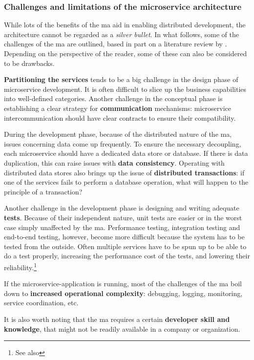 \subsubsection{Challenges and limitations of the microservice architecture}
\label{sssec:microservice-challenges}

While lots of the benefits of the \gls{ma} aid in enabling distributed
development, the architecture cannot be regarded as a \textit{silver bullet}. In
what follows, some of the challenges of the \gls{ma} are outlined, based in part
on a literature review by \textcite{Soldani_2018}. Depending on the perspective
of the reader, some of these can also be considered to be drawbacks.

\textbf{Partitioning the services} tends to be a big challenge in the design
phase of \gls{microservice} development. It is often difficult to slice up the
business capabilities into well-defined categories. Another challenge in the
conceptual phase is establishing a clear strategy for \textbf{communication}
mechanisms: \gls{microservice} intercommunication should have clear contracts to
ensure their compatibility.

During the development phase, because of the distributed nature of the \gls{ma},
issues concerning data come up frequently. To ensure the necessary decoupling,
each \gls{microservice} should have a dedicated data store or database. If there is
data duplication, this can raise issues with \textbf{data consistency}.
Operating with distributed data stores also brings up the issue of
\textbf{distributed transactions}: if one of the services fails to perform a
database operation, what will happen to the principle of a transaction?

Another challenge in the development phase is designing and writing adequate
\textbf{tests}. Because of their independent nature, unit tests are easier or in
the worst case simply unaffected by the \gls{ma}. Performance testing, integration
testing and end-to-end testing, however, become more difficult because the
system has to be tested from the outside. Often multiple services have to be
spun up to be able to do a test properly, increasing the performance cost of the
tests, and lowering their reliability.\footnote{See also
}

If the \gls{microservice}-application is running, most of the challenges
of the \gls{ma} boil down to \textbf{increased operational complexity}:
debugging, logging, monitoring, service coordination, etc. 

It is also worth noting that the \gls{ma} requires a certain \textbf{developer
skill and knowledge}, that might not be readily available in a company or
organization.
